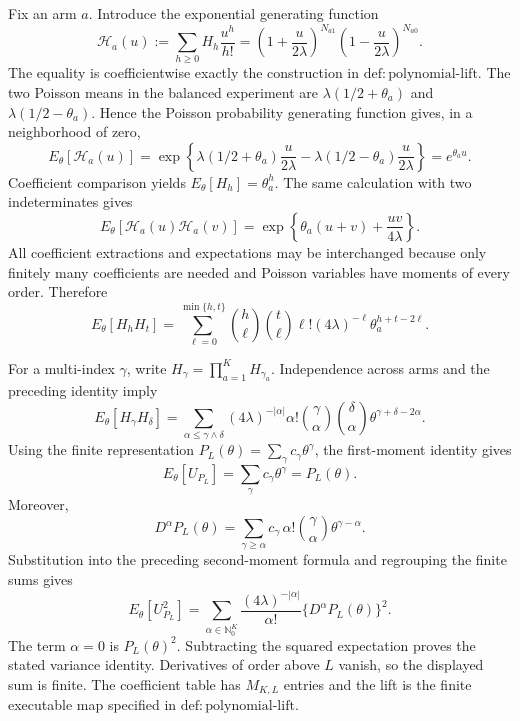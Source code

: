 Fix an arm \(a\).  Introduce the exponential generating function
\[
 \mathcal H_a(u):=\sum_{h\geq 0}H_h\frac{u^h}{h!}
 =\left(1+\frac{u}{2\lambda}\right)^{N_{a1}}
  \left(1-\frac{u}{2\lambda}\right)^{N_{a0}}.
\]
The equality is coefficientwise exactly the construction in \(\mathrm{def{:}polynomial\text{-}lift}\).  The two Poisson means in the balanced experiment are \(\lambda(1/2+\theta_a)\) and \(\lambda(1/2-\theta_a)\).  Hence the Poisson probability generating function gives, in a neighborhood of zero,
\[
 E_\theta[\mathcal H_a(u)]
 =\exp\!\left\{\lambda(1/2+\theta_a)\frac{u}{2\lambda}
                 -\lambda(1/2-\theta_a)\frac{u}{2\lambda}\right\}
 =e^{\theta_a u}.
\]
Coefficient comparison yields \(E_\theta[H_h]=\theta_a^h\).  The same calculation with two indeterminates gives
\[
 E_\theta[\mathcal H_a(u)\mathcal H_a(v)]
 =\exp\!\left\{\theta_a(u+v)+\frac{uv}{4\lambda}\right\}.
\]
All coefficient extractions and expectations may be interchanged because only finitely many coefficients are needed and Poisson variables have moments of every order.  Therefore
\[
 E_\theta[H_hH_t]
 =\sum_{\ell=0}^{\min\{h,t\}}
   \binom h\ell\binom t\ell\ell!(4\lambda)^{-\ell}
   \theta_a^{h+t-2\ell}.
\]

For a multi-index \(\gamma\), write \(H_\gamma=\prod_{a=1}^K H_{\gamma_a}\).  Independence across arms and the preceding identity imply
\[
 E_\theta[H_\gamma H_\delta]
 =\sum_{\alpha\leq\gamma\wedge\delta}
 (4\lambda)^{-|\alpha|}\alpha!
 \binom\gamma\alpha\binom\delta\alpha
 \theta^{\gamma+\delta-2\alpha}.
\]
Using the finite representation \(P_L(\theta)=\sum_\gamma c_\gamma\theta^\gamma\), the first-moment identity gives
\[
 E_\theta[U_{P_L}]=\sum_\gamma c_\gamma\theta^\gamma=P_L(\theta).
\]
Moreover,
\[
 D^\alpha P_L(\theta)
 =\sum_{\gamma\geq\alpha}c_\gamma\,\alpha!\binom\gamma\alpha
   \theta^{\gamma-\alpha}.
\]
Substitution into the preceding second-moment formula and regrouping the finite sums gives
\[
 E_\theta[U_{P_L}^2]
 =\sum_{\alpha\in\mathbb N_0^K}
   \frac{(4\lambda)^{-|\alpha|}}{\alpha!}
   \{D^\alpha P_L(\theta)\}^2.
\]
The term \(\alpha=0\) is \(P_L(\theta)^2\).  Subtracting the squared expectation proves the stated variance identity.  Derivatives of order above \(L\) vanish, so the displayed sum is finite.  The coefficient table has \(M_{K,L}\) entries and the lift is the finite executable map specified in \(\mathrm{def{:}polynomial\text{-}lift}\).

